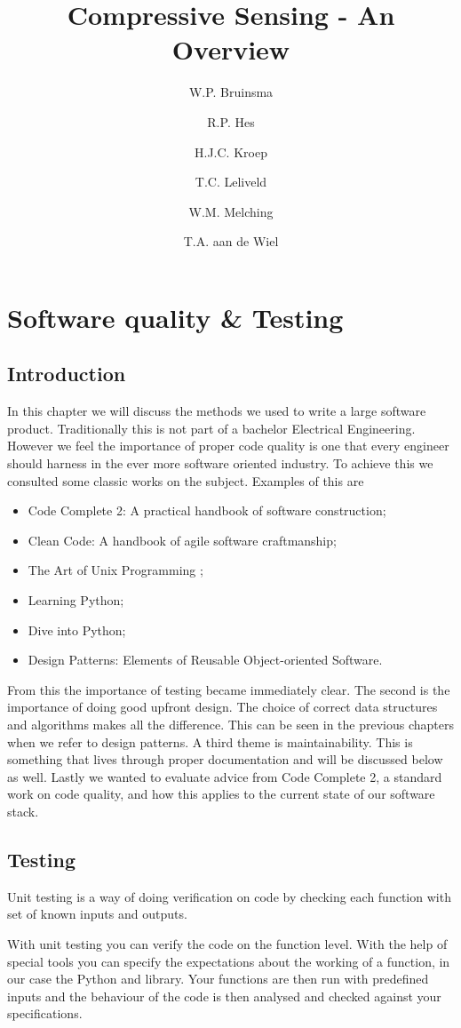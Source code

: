 \documentclass[a4paper, openany, oneside]{memoir}
\title{Compressive Sensing - An Overview}
\author{W.P. Bruinsma \and R.P. Hes \and H.J.C. Kroep \and T.C. Leliveld \and W.M. Melching \and T.A. aan de Wiel}
\begin{document}
\chapter{Software quality \& Testing}
\section{Introduction}
In this chapter we will discuss the methods we used to write a large software product. Traditionally this is not part of a bachelor Electrical Engineering. However we feel the importance of proper code quality is one that every engineer should harness in the ever more software oriented industry. To achieve this we consulted some classic works on the subject. Examples of this are
\begin{itemize}
    \item Code Complete 2: A practical handbook of software construction\cite{mcconnell2004code};
    \item Clean Code: A handbook of agile software craftmanship\cite{martin2008clean};
    \item The Art of Unix Programming \cite{raymond2003art};
    \item Learning Python\cite{lutz2013learning};
    \item Dive into Python\cite{pilgrim2000dive};
    \item Design Patterns: Elements of Reusable Object-oriented Software\cite{designpatterns}.
\end{itemize}
From this the importance of testing became immediately clear. The second is the importance of doing good upfront design. The choice of correct data structures and algorithms makes all the difference. This can be seen in the previous chapters when we refer to design patterns. A third theme is maintainability. This is something that lives through proper documentation and will be discussed below as well. Lastly we wanted to evaluate advice from Code Complete 2, a standard work on code quality, and how this applies to the current state of our software stack.

\section{Testing}
Unit testing is a way of doing verification on code by checking each function with set of known inputs and outputs.

With unit testing you can verify the code on the function level. With the help of special tools you can specify the expectations about the working of a function, in our case the Python  and  library. Your functions are then run with predefined inputs and the behaviour of the code is then analysed and checked against your specifications.
\end{document}
